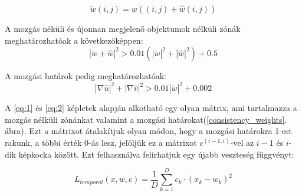 \documentclass[12pt, a4paper, oneside]{book}
\theoremstyle{tetel}
\begin{document}
\begin{equation}
\tilde{w}(i, j) = w((i, j) + \hat{w}(i, j))
\end{equation}

A mozgás néküli és újonnan megjelenő objektumok nélküli zónák meghatározhatóak a következőképpen:
\begin{equation} \label{eq:1}
|\tilde{w} + \hat{w}|^2 > 0.01(|\tilde{w}|^2 + |\hat{w}|^2) + 0.5
\end{equation}

A mozgási határok pedig meghatározhatóak:
\begin{equation} \label{eq:2}
|\nabla\hat{u}|^2 + |\nabla\hat{v}|^2 > 0.01|\tilde{w}|^2 + 0.002
\end{equation}

A \ref{eq:1} és \ref{eq:2} képletek alapján alkotható egy olyan mátrix, ami tartalmazza a mozgás nélküli zónánkat valamint a mozgási határokat(\ref{consistency_weights}. ábra). Ezt a mátrixot átalakítjuk olyan módon, hogy a mozgási határokra 1-est rakunk, a többi érték 0-ás lesz, jelöljük ez a mátrixot \(c^{(i-1,i)}\)-vel az \(i-1\) és \(i\)-dik képkocka között. Ezt felhasználva felírhatjuk egy újabb veszteség függvényt: 

\begin{equation} \label{eq:2}
	L_{temporal}(x, w, c) = \frac{1}{D}\sum_{k=1}^{D}c_k\cdot(x_k-w_k)^2
\end{equation}
\end{document}
